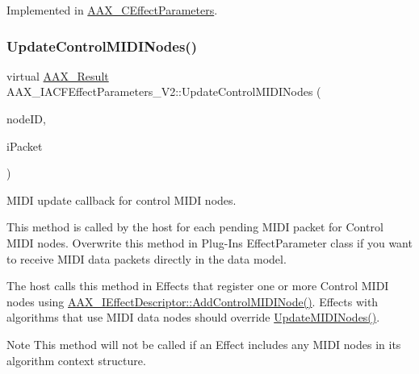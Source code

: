 Implemented in \mbox{\hyperlink{a01481_aac6fa72278c0f46aa430cd79bdb2d767}{A\+A\+X\+\_\+\+C\+Effect\+Parameters}}.

\mbox{\label{a01677_ab4ec161f64086070083c21b566354861}} 
\subsubsection{\texorpdfstring{UpdateControlMIDINodes()}{UpdateControlMIDINodes()}}
{\footnotesize\ttfamily virtual \mbox{\hyperlink{a00392_a4d8f69a697df7f70c3a8e9b8ee130d2f}{A\+A\+X\+\_\+\+Result}} A\+A\+X\+\_\+\+I\+A\+C\+F\+Effect\+Parameters\+\_\+\+V2\+::\+Update\+Control\+M\+I\+D\+I\+Nodes (\begin{DoxyParamCaption}\item[{\mbox{\hyperlink{a00392_ac678f9c1fbcc26315d209f71a147a175}{A\+A\+X\+\_\+\+C\+Type\+ID}}}]{node\+ID,  }\item[{\mbox{\hyperlink{a01429}{A\+A\+X\+\_\+\+C\+Midi\+Packet}} \&}]{i\+Packet }\end{DoxyParamCaption})\hspace{0.3cm}{\ttfamily [pure virtual]}}



M\+I\+DI update callback for control M\+I\+DI nodes. 

This method is called by the host for each pending M\+I\+DI packet for Control M\+I\+DI nodes. Overwrite this method in Plug-\/\+In\textquotesingle{}s Effect\+Parameter class if you want to receive M\+I\+DI data packets directly in the data model.

The host calls this method in Effects that register one or more Control M\+I\+DI nodes using \mbox{\hyperlink{a01813_aa7709de005e0256feb522758ccc5b582}{A\+A\+X\+\_\+\+I\+Effect\+Descriptor\+::\+Add\+Control\+M\+I\+D\+I\+Node()}}. Effects with algorithms that use M\+I\+DI data nodes should override \mbox{\hyperlink{a01677_a229029f0d4bd758538c48931b9f9a9ad}{Update\+M\+I\+D\+I\+Nodes()}}.

\begin{DoxyNote}{Note}
This method will not be called if an Effect includes any M\+I\+DI nodes in its algorithm context structure.
\end{DoxyNote}

